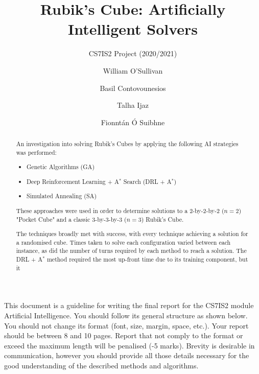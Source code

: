 \documentclass[UKenglish]{libraries/svproc}
\title{Rubik's Cube: Artificially Intelligent Solvers}
\subtitle{CS7IS2 Project (2020/2021)}
\author{
  William O'Sullivan   \and
  Basil Contovounesios \and
  Talha Ijaz           \and
  Fionnt\'an \'O Suibhne}
\institute{\email{
    wosulliv@tcd.ie,
    contovob@tcd.ie,
    ijazm@tcd.ie,
    suibhnef@tcd.ie}}
\begin{document}
\mainmatter
\maketitle              %

\begin{abstract}

An investigation into solving Rubik's Cubes by applying the following AI strategies was performed:
\begin{itemize}
    \item Genetic Algorithms (GA)
    \item Deep Reinforcement Learning + A$^{\ast}$ Search (DRL + A$^{\ast}$)
    \item Simulated Annealing (SA)
\end{itemize}
These approaches were used in order to determine solutions to a 2-by-2-by-2 ($n=2$) "Pocket Cube" and a classic 3-by-3-by-3 ($n=3$) Rubik's Cube.

The techniques broadly met with success, with every technique achieving a solution for a randomised cube. Times taken to solve each configuration varied between each instance, as did the number of turns required by each method to reach a solution. The DRL + A$^{\ast}$ method required the most up-front time due to its training component, but it 




\end{abstract}
%
\iffalse
This document is a guideline for writing the final report for the CS7IS2 module Artificial Intelligence. You should follow its general structure as shown below.
You should not change its format (font, size, margin, space, etc.). 
Your report should be between 8 and 10 pages. Report that not comply to the format or exceed the maximum length will be penalised (-5 marks).
Brevity is desirable in communication, however you should provide all those details necessary for the good understanding of the described methods and algorithms. 
\end{document}
